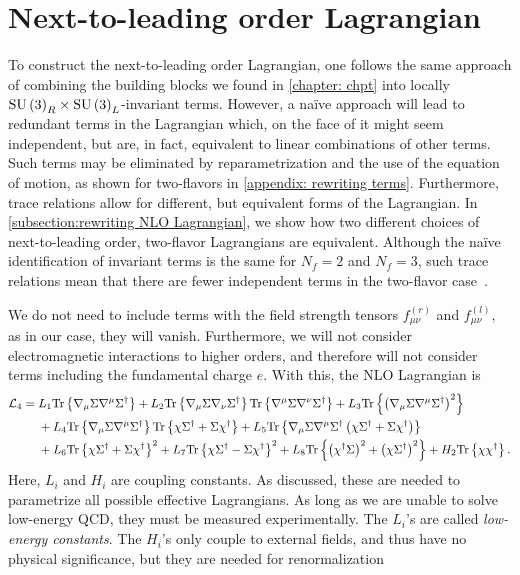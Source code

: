 \section{Next-to-leading order Lagrangian}
\label{section: nlo chpt}


To construct the next-to-leading order Lagrangian, one follows the same approach of combining the building blocks we found in \autoref{chapter: chpt} into locally $\text{SU}\left(3\right)_R\times\text{SU}\left(3\right)_L$-invariant terms.
However, a naïve approach will lead to redundant terms in the Lagrangian which, on the face of it might seem independent, but are, in fact, equivalent to linear combinations of other terms.
Such terms may be eliminated by reparametrization and the use of the equation of motion, as shown for two-flavors in \autoref{appendix: rewriting terms}.
Furthermore, trace relations allow for different, but equivalent forms of the Lagrangian.
In \autoref{subsection:rewriting NLO Lagrangian}, we show how two different choices of next-to-leading order, two-flavor Lagrangians are equivalent.
Although the naïve identification of invariant terms is the same for $N_f = 2$ and $N_f=3$, such trace relations mean that there are fewer independent terms in the two-flavor case~\autocite{schererIntroductionChiralPerturbation2002}.

We do not need to include terms with the field strength tensors $f_{\mu\nu}^{(r)}$ and $f_{\mu\nu}^{(l)}$, as in our case, they will vanish.
Furthermore, we will not consider electromagnetic interactions to higher orders, and therefore will not consider terms including the fundamental charge $e$.
With this, the NLO Lagrangian is~\autocite{gasserChiralPerturbationTheory1985}
%
\begin{align}
    \label{NLO Lagrangian three flavor}
    \nonumber
    \mathcal{L}_4 
    ={} &
    L_1\text{Tr} \left\{ \nabla_\mu \Sigma \nabla^\mu \Sigma^\dagger \right\}
    + L_2 \text{Tr} \left\{ \nabla_\mu \Sigma \nabla_\nu \Sigma^\dagger \right\} 
    \text{Tr} \left\{ \nabla^\mu \Sigma \nabla^\nu \Sigma^\dagger \right\}
    + L_3 \text{Tr} \left\{ \left(\nabla_\mu \Sigma \nabla^\mu \Sigma^\dagger\right)^2 \right\} \\ \nonumber
    & + L_4 \text{Tr} \left\{ \nabla_\mu \Sigma \nabla^\mu \Sigma^\dagger \right\} 
    \text{Tr} \left\{ \chi \Sigma^\dagger + \Sigma \chi^\dagger \right\}
    + L_5 \text{Tr} \left\{ 
        \nabla_\mu \Sigma \nabla^\mu \Sigma^\dagger 
        \left(\chi \Sigma^\dagger + \Sigma \chi^\dagger\right)
     \right\}\\
    &+ L_6 \text{Tr} \left\{ \chi \Sigma^\dagger + \Sigma \chi^\dagger \right\}^2 
     + L_7 \text{Tr} \left\{ \chi \Sigma^\dagger - \Sigma \chi^\dagger \right\}^2
    + L_8 \text{Tr} \left\{  \left(\chi^\dagger \Sigma \right)^2 + \left(\chi \Sigma^\dagger \right)^2 \right\}
    + H_2 \text{Tr} \left\{ \chi \chi^\dagger \right\}.
\end{align}
%
Here, $L_i$ and $H_i$ are coupling constants.
As discussed, these are needed to parametrize all possible effective Lagrangians.
As long as we are unable to solve low-energy QCD, they must be measured experimentally.
The $L_i$'s are called \emph{low-energy constants}.
The $H_i$'s only couple to external fields, and thus have no physical significance, but they are needed for renormalization~\autocite{gasserChiralPerturbationTheory1985}

